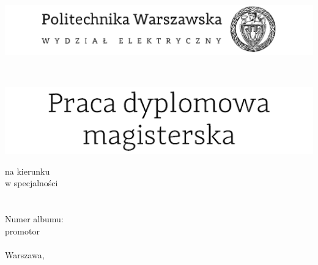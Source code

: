 \begin{titlepage}
\begingroup
\begin{center}		
			\includegraphics[width=1.0\textwidth]{img/pw_header}
			
			\vspace{1.3cm}
			\fontsize{12}{14}\selectfont\myDepartmentFirst \\ \myDepartmentSecond \bigskip
			
			\vspace{1.0cm}
			\includegraphics[width=1.0\textwidth]{img/pw_title}
			
			na kierunku \myCourse \\
			w specjalności \mySpecialization \\
			\vspace{1cm}
			{\fontsize{14}{18}\selectfont \myTitle} \\ 
			
			\vspace{1.5cm}
			\fontsize{21}{25}\selectfont \myName \\
			\fontsize{12}{14}\selectfont
			Numer albumu: \myNumber \\
			\vspace{1.5cm}
			promotor \\
			\myProf \\
			\vfill 
			Warszawa, \myYear
        \vfill                      
\end{center}
\endgroup
\end{titlepage}